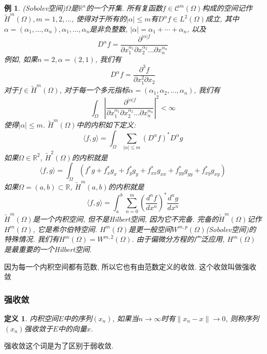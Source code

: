 \documentclass{book}
\newtheorem{definition}{\hspace{2em}定义}[section]
\newtheorem{example}{例}[section]
\begin{document}
\begin{example}
  (Sobolev空间)$\Omega$是$\mathbb{R}^n$的一个开集. 所有复函数$f\in\mathcal{C}^m(\Omega)$构成的空间记作$\tilde{H}^m(\Omega),m=1,2,\dots$, 使得对于所有的$|\alpha|\leq m$有$D^\alpha f\in L^2(\Omega)$成立, 其中$\alpha=(\alpha_1,\dots,\alpha_n), \alpha_1,\dots,\alpha_n$是非负整数, $|\alpha|=\alpha_1+\cdots+\alpha_n$, 以及
  \begin{equation*}
    D^\alpha f=\frac{\partial^{|\alpha|f}}{\partial x_1^{\alpha_1}\partial x_2^{\alpha_2}\dots\partial x_n^{\alpha_n}}
  \end{equation*}
  例如, 如果$n=2,\alpha=(2,1)$, 我们有
  \begin{equation*}
    D^\alpha f=\frac{\partial^3 f}{\partial x_1^2\partial x_2}
  \end{equation*}
  对于$f\in\tilde{H}^m(\Omega)$, 对于每一个多元指标$\alpha=(\alpha_1,\alpha_2,\dots,\alpha_n)$, 我们有
  \begin{equation*}
    \int_{\Omega}|\frac{\partial^{|\alpha| f}}{\partial x_1^{\alpha_1}\partial x_2^{\alpha_2}\dots\partial x_n^{\alpha_n}}|^2<\infty
  \end{equation*}
  使得$|\alpha|\leq m$. $\tilde{H}^m(\Omega)$中的内积如下定义:
  \begin{equation*}
    \langle f,g\rangle=\int_{\Omega}\sum_{|\alpha|\leq m}(D^\alpha f)^*D^\alpha g
  \end{equation*}
  如果$\Omega\in \mathbb{R}^2$, $\tilde{H}^2(\Omega)$的内积就是
  \begin{equation*}
    \langle f,g\rangle=\int_{\Omega}(f^*g+f_x^*g_x+f_y^*g_y+f_{xx}^*g_{xx}+f_{yy}^*g_{yy}+f_{xy}^*g_{xy})
  \end{equation*}
  如果$\Omega=(a,b)\subset \mathbb{R}$, $\tilde{H}^m(a,b)$的内积就是
  \begin{equation*}
    \langle f,g\rangle=\int_{a}^{b}\sum_{n=0}^{m}(\frac{d^n f}{dx^n})^* \frac{d^n g}{dx^n}
  \end{equation*}
  $\tilde{H}^m(\Omega)$是一个内积空间, 但不是Hilbert空间, 因为它不完备. 完备的$\tilde{H}^m(\Omega)$记作$H^m(\Omega)$, 它是希尔伯特空间. $H^m(\Omega)$是更一般空间$W^{m,p}(\Omega)$(Sobolev空间)的特殊情况. 我们有$H^m(\Omega)=W^{m,2}(\Omega)$. 由于偏微分方程的广泛应用, $H^m(\Omega)$是最重要的一个Hilbert空间.
\end{example}
因为每一个内积空间都有范数, 所以它也有由范数定义的收敛. 这个收敛叫做强收敛
\subsubsection*{强收敛}
\begin{definition}
  内积空间$E$中的序列$(x_n)$, 如果当$n\to\infty$时有$\|x_n-x\|\to 0$, 则称序列$(x_n)$强收敛于$E$中的向量$x$.
\end{definition}
强收敛这个词是为了区别于弱收敛.
\end{document}
